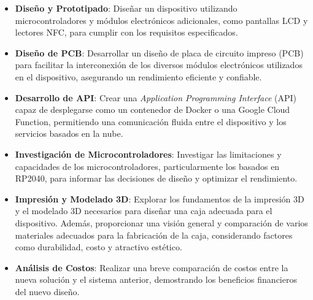 \begin{itemize}
	\item \textbf{Diseño y Prototipado}: Diseñar un dispositivo utilizando microcontroladores y 
	módulos electrónicos adicionales, como pantallas LCD y lectores NFC, para cumplir con los 
	requisitos especificados.
	\item \textbf{Diseño de PCB}: Desarrollar un diseño de placa de circuito impreso (PCB) para 
	facilitar la interconexión de los diversos módulos electrónicos utilizados en el dispositivo, 
	asegurando un rendimiento eficiente y confiable.
	\item \textbf{Desarrollo de API}: Crear una \textit{Application Programming Interface} (API) 
	capaz de desplegarse como un contenedor de Docker o una Google Cloud Function, permitiendo una 
	comunicación fluida entre el dispositivo y los servicios basados en la nube.
	\item \textbf{Investigación de Microcontroladores}: Investigar las limitaciones y capacidades 
	de los microcontroladores, particularmente los basados en RP2040, para informar las decisiones 
	de diseño y optimizar el rendimiento.
	\item \textbf{Impresión y Modelado 3D}: Explorar los fundamentos de la impresión 3D y el 
	modelado 3D necesarios para diseñar una caja adecuada para el dispositivo. Además, proporcionar 
	una visión general y comparación de varios materiales adecuados para la fabricación de la 
	caja, considerando factores como durabilidad, costo y atractivo estético.
	\item \textbf{Análisis de Costos}: Realizar una breve comparación de costos entre la nueva 
	solución y el sistema anterior, demostrando los beneficios financieros del nuevo diseño.
\end{itemize}